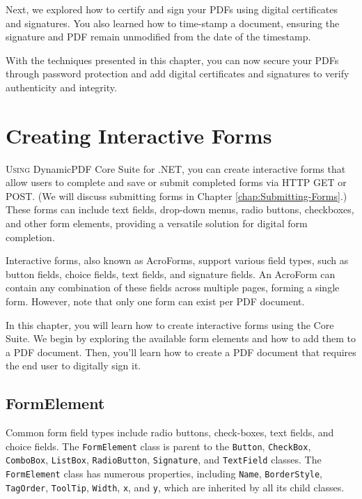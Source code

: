 \documentclass[american,letterpaper]{tufte-book}
\numberwithin{equation}{section}
\numberwithin{figure}{section}
\def\color#1{}%
\begin{document}
{Next, we explored how to certify and sign your PDFs using digital certificates and signatures. You also learned how to time-stamp a document, ensuring the signature and PDF remain unmodified from the date of the timestamp.

With the techniques presented in this chapter, you can now secure your PDFs through password protection and add digital certificates and signatures to verify authenticity and integrity.
\color{white}
\chapter{Creating Interactive Forms}\label{chap:Interactive-Forms}
\color{black}
\BgThispage
\vspace{8.0em}
\lettrine[lines=2,lhang=0.1]{U}{sing} DynamicPDF Core Suite for .NET, you can create interactive forms that allow users to complete and save or submit completed forms via HTTP GET or POST. (We will discuss submitting forms in Chapter \ref{chap:Submitting-Forms}.) These forms can include text fields, drop-down menus, radio buttons, checkboxes, and other form elements, providing a versatile solution for digital form completion.

Interactive forms, also known as AcroForms, support various field types, such as button fields, choice fields, text fields, and signature fields. An AcroForm can contain any combination of these fields across multiple pages, forming a single form. However, note that only one form can exist per PDF document.


In this chapter, you will learn how to create interactive forms using the Core Suite. We begin by exploring the available form elements and how to add them to a PDF document. Then, you'll learn how to create a PDF document that requires the end user to digitally sign it.
\section{FormElement}

Common form field types include radio buttons, check-boxes, text fields,
and choice fields. The \texttt{FormElement} class is parent to the
\texttt{Button}, \texttt{CheckBox}, \texttt{ComboBox}, \texttt{ListBox},
\texttt{RadioButton}, \texttt{Signature}, and \texttt{TextField} classes.
The \texttt{FormElement} class has numerous properties, including
\texttt{Name}, \texttt{BorderStyle}, \texttt{TagOrder}, \texttt{ToolTip},
\texttt{Width}, \texttt{x}, and \texttt{y}, which are inherited by
all its child classes. 

}
\end{document}
